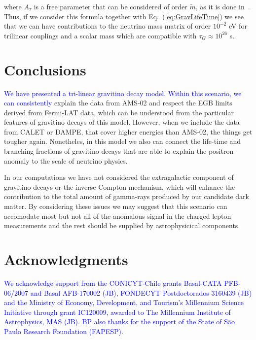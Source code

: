 \documentclass[a4paper,11pt]{article}
\newcommand*{\blue}{\textcolor{blue}}
\begin{document}
\noindent where $A_{\tau}$ is a free parameter that can be considered
of order $\tilde{m}$, as it is done in~\cite{Chun:2004mu}. Thus, if we
consider this formula together with Eq.~(\ref{eq:GravLifeTime}) we
see that we can have contributions to the neutrino mass matrix of
order $10^{-2}$ eV for trilinear couplings and a scalar mass
which are compatible with $\tau_{G}\approx10^{26}$ s.

\section{Conclusions}
\label{sec:conclusions}
\blue{We have presented a tri-linear gravitino decay model. Within this scenario, we can consistently} explain the data from AMS-02 and respect the EGB limits derived from Fermi-LAT data, which can be understood from the particular features of gravitino decays of this model. However, when we include the data from CALET or DAMPE, that cover higher energies than AMS-02, the things get tougher again. Nonetheles, in this model we also can connect the life-time and branching fractions of gravitino decays that are able to explain the positron anomaly to the scale of neutrino physics. 

In our computations we have not considered the extragalactic component of gravitino decays or the inverse Compton mechanism, which will enhance the contribution to the total amount of gamma-rays produced by our candidate dark matter. By considering these issues we may suggest that this scenario can accomodate most but not all of the anomalous signal in the charged lepton measurements and the rest should be supplied by astrophysicical components. 

\section*{Acknowledgments}

{\small 
\blue{We acknowledge support from the CONICYT-Chile grants Basal-CATA
PFB-06/2007 and Basal AFB-170002 (JB), FONDECYT Postdoctorados 3160439 (JB) and the Ministry of Economy, Development, and Tourism's Millennium Science Initiative through grant IC120009, awarded to The Millennium Institute of Astrophysics, MAS (JB). BP also thanks for the support of the State of S\~{a}o Paulo Research Foundation (FAPESP).}


}
\end{document}
